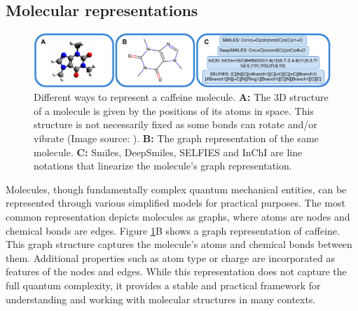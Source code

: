 \subsection{Molecular representations}
\begin{figure}
    \centering
    \includegraphics[width=\textwidth]{figures/representations/representations.pdf}
    \caption{Different ways to represent a caffeine molecule. \textbf{A:} The 3D structure of a
        molecule is given by the positions of its atoms in space. This structure is not
        necessarily fixed as some bonds can rotate and/or vibrate (Image source:
        \citep{Caffeine3DStructure2010}). \textbf{B:} The graph representation of the same
        molecule. \textbf{C:} Smiles, DeepSmiles, SELFIES and InChI are line notations that
        linearize the molecule's graph representation.\label{fig:molecular-graph}}
\end{figure}
Molecules, though fundamentally complex quantum mechanical entities, can be represented through
various simplified models for practical purposes. The most common representation depicts molecules
as graphs, where atoms are nodes and chemical bonds are edges. Figure \ref{fig:molecular-graph}B
shows a graph representation of caffeine. This graph structure captures the molecule's atoms
and chemical bonds between them. Additional properties such as atom type or charge are
incorporated as features of the nodes and edges. While this representation does not capture the full
quantum complexity, it provides a stable and practical framework for understanding and working with
molecular structures in many contexts.

